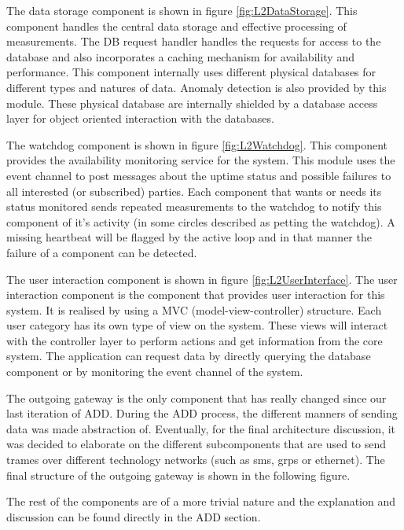 The data storage component is shown in figure \ref{fig:L2DataStorage}. 
This component handles the central data storage and effective processing of measurements. 
The DB request handler handles the requests for access to the database and also incorporates a caching mechanism for availability and performance. 
This component internally uses different physical databases for different types and natures of data.
Anomaly detection is also provided by this module. These physical database are internally shielded by a
database access layer for object oriented interaction with the databases.

The watchdog component is shown in figure \ref{fig:L2Watchdog}. This component provides the availability monitoring service for the system. This module uses the event channel to post messages about the uptime status and 
possible failures to all interested (or subscribed) parties. 
Each component that wants or needs its status monitored sends repeated measurements to the watchdog to notify this component of it's activity (in some circles described as petting the watchdog).
A missing heartbeat will be flagged by the active loop and in that manner the failure of a component can be detected.

The user interaction component is shown in figure \ref{fig:L2UserInterface}.
The user interaction component is the component that provides user interaction for this system. It is realised by using a MVC (model-view-controller) structure. Each user category has its own type of view on the system. These views will interact with the controller layer to perform actions and get information from the core system. The application can request data by directly querying the database component or by monitoring the event channel of the system.

The outgoing gateway is the only component that has really changed since our last iteration of ADD.
During the ADD process, the different manners of sending data was made abstraction of. Eventually,
for the final architecture discussion, it was decided to elaborate on the different subcomponents that
are used to send trames over different technology networks (such as sms, grps or ethernet).
The final structure of the outgoing gateway is shown in the following figure.

The rest of the components are of a more trivial nature and the explanation and discussion can be found directly in the ADD section.

